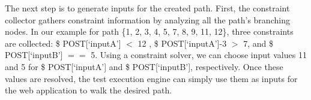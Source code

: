 The next step is to generate inputs for the created path. 
First, the constraint collector gathers constraint information
by analyzing all the path's branching nodes. 
In our example for path \{1, 2, 3, 4, 5, 7, 8, 9, 11, 12\}, 
three constraints are collected:  
\$ POST[`inputA'] $<$ 12 , \$ POST[`inputA']-3 $>$ 7, and 
\$ POST[`inputB'] $==$ 5. 
Using a constraint solver, we can choose input values 11 and 
5 for \$ POST[`inputA'] and \$ POST[`inputB'], respectively.
Once these values are resolved, the test execution engine
can simply use them as inputs for the web application to walk 
the desired path.

 
